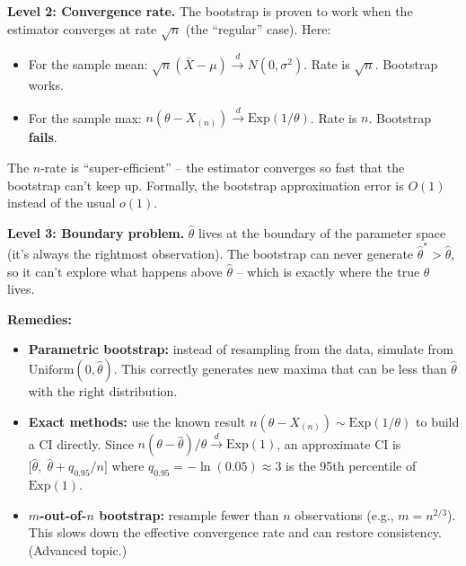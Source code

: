 \documentclass[11pt]{article}
\begin{document}
\textbf{Level 2: Convergence rate.} The bootstrap is proven to work when the estimator converges at rate $\sqrt{n}$ (the ``regular'' case). Here:
\begin{itemize}
  \item For the sample mean: $\sqrt{n}(\bar{X} - \mu) \xrightarrow{d} N(0, \sigma^2)$. Rate is $\sqrt{n}$. Bootstrap works.
  \item For the sample max: $n(\theta - X_{(n)}) \xrightarrow{d} \text{Exp}(1/\theta)$. Rate is $n$. Bootstrap \textbf{fails}.
\end{itemize}
The $n$-rate is ``super-efficient'' -- the estimator converges so fast that the bootstrap can't keep up. Formally, the bootstrap approximation error is $O(1)$ instead of the usual $o(1)$.

\textbf{Level 3: Boundary problem.} $\hat{\theta}$ lives at the boundary of the parameter space (it's always the rightmost observation). The bootstrap can never generate $\hat{\theta}^* > \hat{\theta}$, so it can't explore what happens above $\hat{\theta}$ -- which is exactly where the true $\theta$ lives.

\textbf{Remedies:}
\begin{itemize}
  \item \textbf{Parametric bootstrap:} instead of resampling from the data, simulate from $\text{Uniform}(0, \hat{\theta})$. This correctly generates new maxima that can be less than $\hat{\theta}$ with the right distribution.
  \item \textbf{Exact methods:} use the known result $n(\theta - X_{(n)}) \sim \text{Exp}(1/\theta)$ to build a CI directly. Since $n(\theta - \hat{\theta})/\theta \xrightarrow{d} \text{Exp}(1)$, an approximate CI is $\bigl[\hat{\theta},\; \hat{\theta} + q_{0.95}/n\bigr]$ where $q_{0.95} = -\ln(0.05) \approx 3$ is the 95th percentile of $\text{Exp}(1)$.
  \item \textbf{$m$-out-of-$n$ bootstrap:} resample fewer than $n$ observations (e.g., $m = n^{2/3}$). This slows down the effective convergence rate and can restore consistency. (Advanced topic.)
\end{itemize}
\end{document}
